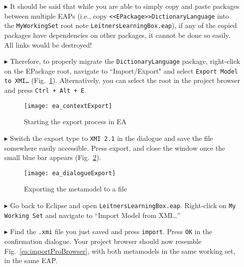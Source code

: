 \begin{itemize}
\item[$\blacktriangleright$] It should be said that while you are able to simply copy and paste packages between multiple EAPs (i.e., copy
\texttt{<<E\-Pack\-age>>Dict\-ion\-ary\-Lang\-uage} into the \texttt{MyWorkingSet} root note \texttt{LeitnersLearningBox.eap}), if any of the copied packages
have dependencies on other packages, it cannot be done so easily. All links would be destroyed! 

\clearpage

\item[$\blacktriangleright$] Therefore, to properly migrate the \texttt{DictionaryLanguage} package, right-click on the EPackage root, navigate to
``Import/Export" and select \texttt{Export Model to XMI\ldots} (Fig.~\ref{ea:contextExport}). Alternatively, you can select the root in the project browser and
press \texttt{Ctrl + Alt + E}.

\vspace{0.5cm}

\begin{figure}[htbp]
\begin{center}
  \texttt{[image: ea\_contextExport]}
  \caption{Starting the export process in EA}
  \label{ea:contextExport}
\end{center}
\end{figure}

\item[$\blacktriangleright$] Switch the export type to \texttt{XMI 2.1} in the dialogue and save the file somewhere easily accessible. Press export, and close
the window once the small blue bar appears (Fig.~\ref{ea:export}).

\begin{figure}[htbp]
\begin{center}
  \texttt{[image: ea\_dialogueExport]}
  \caption{Exporting the metamodel to a file}
  \label{ea:export}
\end{center}
\end{figure}

\item[$\blacktriangleright$] Go back to Eclipse and open \texttt{LeitnersLearningBox.eap}. Right-click on \texttt{My Working Set} and navigate to ``Import
Model from XMI\ldots''

\item[$\blacktriangleright$] Find the \texttt{.xmi} file you just saved and
press \texttt{import}. Press \texttt{OK} in the confirmation dialogue. Your project browser should now resemble Fig.~\ref{ea:importProBrowser}, with both metamodels in the same working set, in the same EAP.


\end{itemize}
